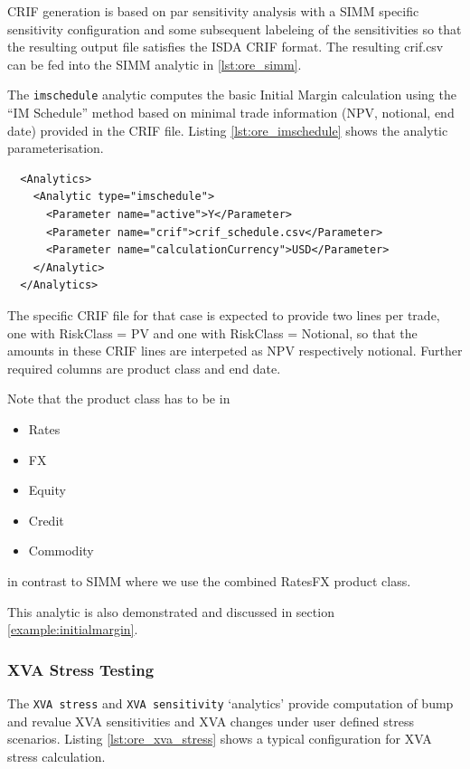 CRIF generation is based on par sensitivity analysis with a SIMM specific sensitivity configuration
and some subsequent labeleing of the sensitivities so that the resulting output file satisfies the ISDA CRIF format.
The resulting crif.csv can be fed into the SIMM analytic in \ref{lst:ore_simm}.

\medskip
The {\tt imschedule} analytic computes the basic Initial Margin calculation using the ``IM Schedule''
method based on minimal trade information (NPV, notional, end date) provided in the CRIF file.
Listing \ref{lst:ore_imschedule} shows the analytic parameterisation.

\begin{listing}[H]
\begin{verbatim}
  <Analytics>
    <Analytic type="imschedule">
      <Parameter name="active">Y</Parameter>
      <Parameter name="crif">crif_schedule.csv</Parameter>
      <Parameter name="calculationCurrency">USD</Parameter>
    </Analytic>
  </Analytics>
\end{verbatim}
\caption{ORE analytic: IM Schedule}
\label{lst:ore_imschedule}
\end{listing}

The specific CRIF file for that case is expected to provide two lines per trade, one with
RiskClass = PV and one with RiskClass = Notional, so that the amounts in these CRIF lines are
interpeted as NPV respectively notional. Further required columns are product class and end date.

Note that the product class has to be in
\begin{itemize}
\item Rates
\item FX
\item Equity
\item Credit
\item Commodity
\end{itemize}
in contrast to SIMM where we use the combined RatesFX product class.

This analytic is also demonstrated and discussed in section \ref{example:initialmargin}.

\subsubsection{XVA Stress Testing}

The {\tt XVA stress} and {\tt XVA sensitivity} `analytics' provide computation of bump and revalue
XVA sensitivities and XVA changes under user defined stress scenarios. Listing \ref{lst:ore_xva_stress}
shows a typical configuration for XVA stress calculation.

